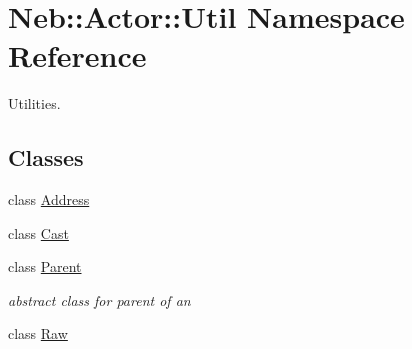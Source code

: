 \hypertarget{namespaceNeb_1_1Actor_1_1Util}{\section{\-Neb\-:\-:\-Actor\-:\-:\-Util \-Namespace \-Reference}
\label{namespaceNeb_1_1Actor_1_1Util}
}


\-Utilities.  


\subsection*{\-Classes}
\begin{DoxyCompactItemize}
\item 
class \hyperlink{classNeb_1_1Actor_1_1Util_1_1Address}{\-Address}
\item 
class \hyperlink{classNeb_1_1Actor_1_1Util_1_1Cast}{\-Cast}
\item 
class \hyperlink{classNeb_1_1Actor_1_1Util_1_1Parent}{\-Parent}
\begin{DoxyCompactList}\small\item\em abstract class for parent of an  \end{DoxyCompactList}\item 
class \hyperlink{classNeb_1_1Actor_1_1Util_1_1Raw}{\-Raw}
\end{DoxyCompactItemize}
